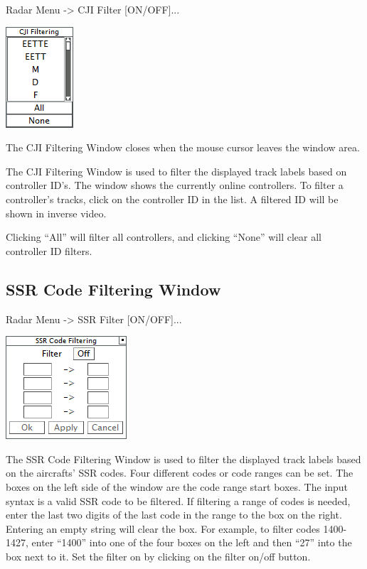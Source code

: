 \documentclass[11pt,a4paper]{memoir}
\begin{document}
Radar Menu -> CJI Filter [ON/OFF]...

\includegraphics{img/cji.png}

The CJI Filtering Window closes when the mouse cursor leaves the window area.

The CJI Filtering Window is used to filter the displayed track labels based on controller ID’s. The window shows the currently online controllers. To filter a controller’s tracks, click on the controller ID in the list. A filtered ID will be shown in inverse video.

Clicking “All” will filter all controllers, and clicking “None” will clear all controller ID filters.

\subsection{SSR Code Filtering Window}
\label{win:ssr}

Radar Menu -> SSR Filter [ON/OFF]...

\includegraphics{img/ssrfil.png}

The SSR Code Filtering Window is used to filter the displayed track labels based on the aircrafts’ SSR codes. Four different codes or code ranges can be set. The boxes on the left side of the window are the code range start boxes. The input syntax is a valid SSR code to be filtered. If filtering a range of codes is needed, enter the last two digits of the last code in the range to the box on the right. Entering an empty string will clear the box. For example, to filter codes 1400-1427, enter “1400” into one of the four boxes on the left and then “27” into the box next to it. Set the filter on by clicking on the filter on/off button.
\end{document}
